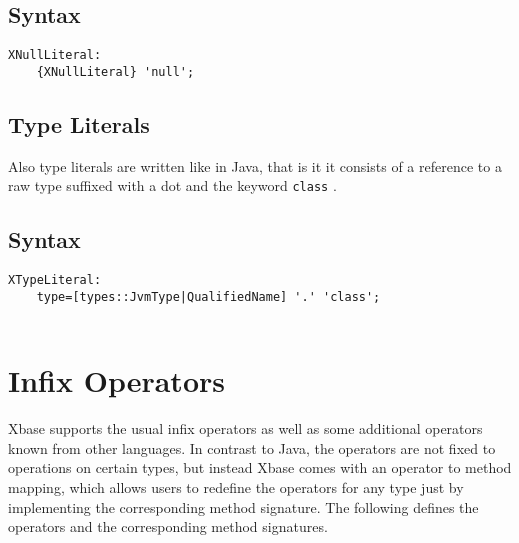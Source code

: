 \documentclass[a4paper,10pt]{scrreprt}
\begin{document}
\subsection{Syntax}
\begin{lstlisting}
XNullLiteral:
	{XNullLiteral} 'null';

\end{lstlisting}





\subsection{Type Literals\label{TypeLiteral}}
Also type literals are written like in Java, that is it it consists of a reference to a raw type suffixed with a dot and the keyword \lstinline{class}
.




\subsection{Syntax}
\begin{lstlisting}
XTypeLiteral:
	type=[types::JvmType|QualifiedName] '.' 'class';
 
\end{lstlisting}







\section{Infix Operators\label{Operators}}
Xbase supports the usual infix operators as well as some additional operators known from other languages. In contrast to Java, the operators are not fixed
to operations on certain types, but instead Xbase comes with an operator to method mapping, which allows users to redefine the operators for any type just by implementing
the corresponding method signature. The following defines the operators and the corresponding method signatures.
\end{document}
